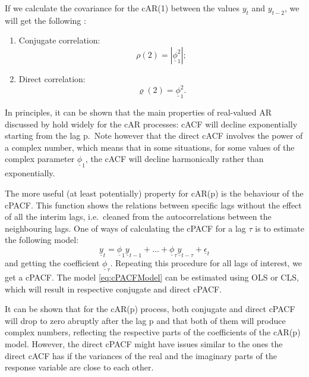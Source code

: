 \documentclass[
]{book}
\begin{document}
If we calculate the covariance for the cAR(1) between the values \(y_{t}\) and \(y_{t-2}\), we will get the following \citep[the reader is encouraged to do the calculations manually to check the correctness of the final result, but also see][]{Knight2019}:

\begin{enumerate}
\def\labelenumi{\arabic{enumi}.}
\item
  Conjugate correlation:
  \begin{equation}
   \rho(2) = | \underline{\phi}_1^2 |;
   \label{eq:ComplexAR1ConjCor}
  \end{equation}
\item
  Direct correlation:
  \begin{equation}
   \varrho(2) =  \underline{\phi}_1^2.
   \label{eq:ComplexAR1DirCor}
  \end{equation}
\end{enumerate}

In principles, it can be shown that the main properties of real-valued AR discussed by \citet{Box1976} hold widely for the cAR processes: cACF will decline exponentially starting from the lag p.~Note however that the direct cACF involves the power of a complex number, which means that in some situations, for some values of the complex parameter \(\underline{\phi}_1\), the cACF will decline harmonically rather than exponentially.

The more useful (at least potentially) property for cAR(p) is the behaviour of the cPACF. This function shows the relations between specific lags without the effect of all the interim lags, i.e.~cleaned from the autocorrelations between the neighbouring lags. One of ways of calculating the cPACF for a lag \(\tau\) is to estimate the following model:
\begin{equation}
    \underline{y}_t = \underline{\phi}_1 \underline{y}_{t-1} + \dots + \underline{\phi}_\tau \underline{y}_{t-\tau} + \underline{\epsilon}_t
    \label{eq:cPACFModel}
\end{equation}
and getting the coefficient \(\underline{\phi}_\tau\). Repeating this procedure for all lags of interest, we get a cPACF. The model \eqref{eq:cPACFModel} can be estimated using OLS or CLS, which will result in respective conjugate and direct cPACF.

It can be shown that for the cAR(p) process, both conjugate and direct cPACF will drop to zero abruptly after the lag p and that both of them will produce complex numbers, reflecting the respective parts of the coefficients of the cAR(p) model. However, the direct cPACF might have issues similar to the ones the direct cACF has if the variances of the real and the imaginary parts of the response variable are close to each other.
\end{document}
